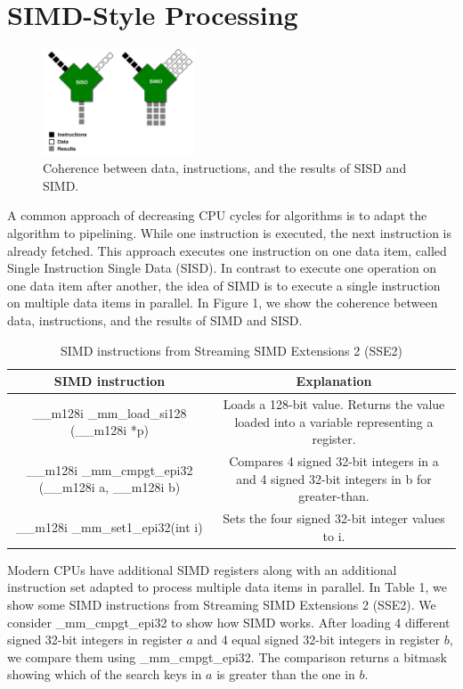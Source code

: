 \documentclass[conference]{IEEEtran}
\begin{document}
\section{SIMD-Style Processing}
\begin{figure}
	\includegraphics[width=0.4\textwidth]{figure_1.png}
	\caption{Coherence between data, instructions, and the results of SISD and SIMD.}
	\label{fig}
\end{figure}
A common approach of decreasing CPU cycles for algorithms is to adapt the algorithm to pipelining. While one instruction is executed, the next instruction is already fetched. This approach executes one instruction on one data item, called Single Instruction Single Data (SISD). In contrast to execute one operation on one data item after another, the idea of SIMD is to execute a single instruction on multiple data items in parallel. In Figure 1, we show the coherence between data, instructions, and the results of SIMD and SISD. 
\begin{table}[htbp]
	\caption{SIMD instructions from Streaming SIMD Extensions 2 (SSE2)}
	\begin{center}
		\begin{tabular}{|c|c|}
			\hline
			\textbf{SIMD instruction}&\textbf{Explanation}\\
			\hline
			\_\_m128i \_mm\_load\_si128 (\_\_m128i *p) & Loads a 128-bit value. Returns the value loaded into a variable representing a register.\\
			\_\_m128i \_mm\_cmpgt\_epi32 (\_\_m128i a, \_\_m128i b) & Compares 4 signed 32-bit integers in a and 4 signed 32-bit integers
			in b for greater-than.\\
			\_\_m128i \_mm\_set1\_epi32(int i) & Sets the four signed 32-bit integer values to i.\\
			\hline
		\end{tabular}
		\label{tab1}
	\end{center}
\end{table}
Modern CPUs have additional SIMD registers along with an additional instruction set adapted to process multiple data items in parallel. In Table 1, we show some SIMD instructions from Streaming SIMD Extensions 2 (SSE2). We consider \_mm\_cmpgt\_epi32 to show how SIMD works. After loading 4 different signed 32-bit integers in register $a$ and 4 equal signed 32-bit integers in register $b$, we compare them using \_mm\_cmpgt\_epi32. The comparison returns a bitmask showing which of the search keys in $a$ is greater than the one in $b$. 
\end{document}
